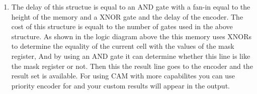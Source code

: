 \documentclass[12pt]{article}
\begin{document}
    \begin{enumerate}
        \item

            The delay of this structue is equal to an AND gate with a fan-in equal
            to the height of the memory and a XNOR gate and the delay of the encoder.
            The cost of this structure is equalt to the number of gates used in the
            above structure.
            As shown in the logic diagram above the this memory uses XNORs to
            determine the equality of the current cell with the values of the
            mask register, And by using an AND gate it can determine whether this
            line is like the mask register or not. Then this the result line
            goes to the encoder and the result set is available.
            For using CAM with more capabilites you can use priority encoder for
            and your custom results will appear in the output.


\end{enumerate}
\end{document}
